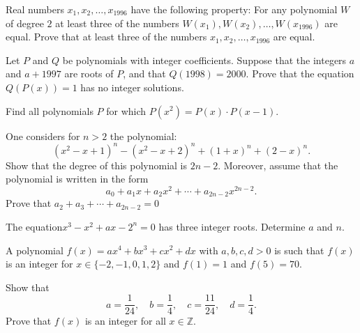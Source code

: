\documentclass[12pt,a4paper]{memoir}
\theoremstyle{definition}
\begin{document}
\begin{question}[name={1996 Baltic Way}]
	Real numbers $x_1,x_2,\dots ,x_{1996}$ have the following property: For any polynomial $W$ of degree $2$ at least three of the numbers $W(x_1),W(x_2),\dots ,W(x_{1996})$ are equal. Prove that at least three of the numbers $x_1,x_2,\dots ,x_{1996}$ are equal.
\end{question}


\begin{question}[name={1997 Baltic Way}]
	Let $P$ and $Q$ be polynomials with integer coefficients. Suppose that the integers $a$ and $a+1997$ are roots of $P$, and that $Q(1998)=2000$. Prove that the equation $Q(P(x))=1$ has no integer solutions.	
\end{question}


\begin{question}
	Find all polynomials $P$ for which $P(x^2) = P(x) \cdot P(x-1)$.
\end{question}

\begin{question}[name={1963 Dutch Mathematical Olympiad}]
	One considers for $n > 2$ the polynomial: $$(x^2-x+1)^n - (x^2-x+2)^n+ (1+x)^n+(2-x)^n.$$ Show that the degree of this polynomial is $2n - 2$.
	Moreover, assume that the polynomial is written in the form $$a_0+a_1x+a_2x^2+\cdots +a_{2n-2}x^{2n-2}.$$ Prove that $a_2+a_3+\cdots+a_{2n-2}=0$
\end{question}

\begin{question}[name={1970 Dutch Mathematical Olympiad}]
	The equation$ x^3 - x^2 + ax - 2^n = 0$ has three integer roots. Determine $a$ and $n$.
\end{question}

\begin{question}[name={1990 Dutch Mathematical Olympiad}]
	A polynomial $f(x)=ax^4+bx^3+cx^2+dx$ with $ a,b,c,d>0$ is such that $ f(x)$ is an integer for $ x \in \{ -2,-1,0,1,2 \}$ and $ f(1)=1$ and $ f(5)=70$.
	\begin{tasks}
		\task Show that \[a=\frac{1}{24}, \quad b=\frac{1}{4},\quad c=\frac{11}{24}, \quad d=\frac{1}{4}.\]
		\task Prove that $f(x)$ is an integer for all $ x \in \mathbb{Z}$.
	\end{tasks}
\end{question}
\end{document}
